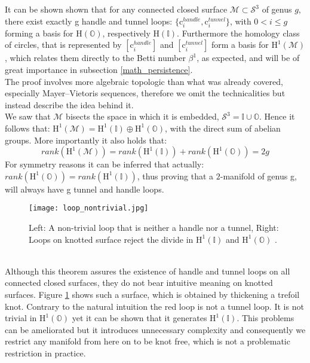 It can be shown shown that for any connected closed surface $\mathcal{M} \subset \mathcal{S}^{3}$ of genus $g$, there exist exactly g handle and tunnel loops: $\{\mathrm{c}^{handle}_{i}, \mathrm{c}^{tunnel}_{i}\}$, with $0 < i \leq g$ forming a basis for $\mathrm{H}(\mathbb{O})$, respectively $\mathrm{H}(\mathbb{I})$.
Furthermore the homology class of circles, that is represented by $[\mathrm{c}^{handle}_{i}]$ and $[\mathrm{c}^{tunnel}_{i}]$ form a basis for $\mathrm{H}^{1}(\mathcal{M})$, which relates them directly to the Betti number $\beta^{1}$, as expected, and will be of great importance in subsection \ref{math_persistence}.\\
The proof involves more algebraic topologic than what was already covered, especially Mayer–Vietoris sequences, therefore we omit the technicalities but instead describe the idea behind it.\\
We saw that $\mathcal{M}$ bisects the space in which it is embedded, $\mathcal{S}^{3} = \mathbb{I} \cup \mathbb{O}$.
Hence it follows that: $\mathrm{H}^{1}(\mathcal{M}) = \mathrm{H}^{1}(\mathbb{I}) \oplus \mathrm{H}^{1}(\mathbb{O})$, with the direct sum of abelian groups.
More importantly it also holds that:
\begin{equation}
rank(\mathrm{H}^{1}(\mathcal{M})) = rank(\mathrm{H}^{1}(\mathbb{I})) + rank(\mathrm{H}^{1}(\mathbb{O})) = 2g
\end{equation}
For symmetry reasons it can be inferred that actually: $rank(\mathrm{H}^{1}(\mathbb{O})) = rank(\mathrm{H}^{1}(\mathbb{I}))$, thus proving that a $2$-manifold of genus g, will always have g tunnel and handle loops.
\begin{figure}[htb]
\centering
\texttt{[image: loop\_nontrivial.jpg]}
\caption{Left: A non-trivial loop that is neither a handle nor a tunnel, Right: Loops on knotted surface reject the divide in $\mathrm{H}^{1}(\mathbb{I})$ and $\mathrm{H}^{1}(\mathbb{O})$ \citep[][]{Dey2012}.}
\label{fig:loop_nontrivial}
\end{figure}\\
Although this theorem assures the existence of handle and tunnel loops on all connected closed surfaces, they do not bear intuitive meaning on knotted surfaces.
Figure \ref{fig:loop_nontrivial} shows such a surface, which is obtained by thickening a trefoil knot.
Contrary to the natural intuition the red loop is not a tunnel loop.
It is not trivial in $\mathrm{H}^{1}(\mathbb{O})$ yet it can be shown that it generates $\mathrm{H}^{1}(\mathbb{I})$.
This problems can be ameliorated but it introduces unnecessary complexity and consequently we restrict any manifold from here on to be knot free, which is not a problematic restriction in practice.\\

